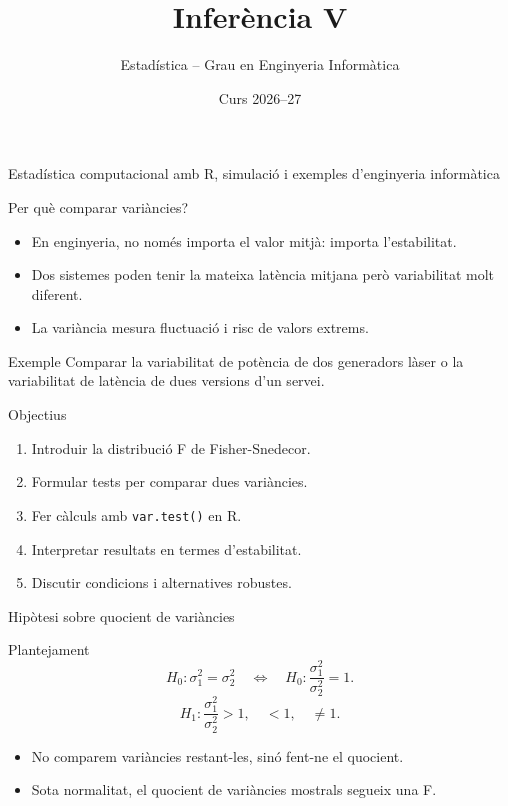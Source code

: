 \documentclass[10pt,aspectratio=169]{beamer}
\title[Inferència V]{Inferència V}
\author{Estadística -- Grau en Enginyeria Informàtica}
\date{Curs 2026--27}
\newcommand{\R}{\textsf{R}}
\begin{document}
\begin{frame}[plain]
  \titlepage
  \vspace{-0.45cm}
  \begin{center}
  \small\textcolor{DeepBlue}{Estadística computacional amb \R, simulació i exemples d'enginyeria informàtica}
  \end{center}
\end{frame}


\begin{frame}[fragile]{Per què comparar variàncies?}
\begin{itemize}
  \item En enginyeria, no només importa el valor mitjà: importa l'estabilitat.
  \item Dos sistemes poden tenir la mateixa latència mitjana però variabilitat molt diferent.
  \item La variància mesura fluctuació i risc de valors extrems.
\end{itemize}
\begin{block}{Exemple}
Comparar la variabilitat de potència de dos generadors làser o la variabilitat de latència de dues versions d'un servei.
\end{block}
\end{frame}

\begin{frame}[fragile]{Objectius}
\begin{enumerate}
  \item Introduir la distribució F de Fisher-Snedecor.
  \item Formular tests per comparar dues variàncies.
  \item Fer càlculs amb \texttt{var.test()} en \R.
  \item Interpretar resultats en termes d'estabilitat.
  \item Discutir condicions i alternatives robustes.
\end{enumerate}
\end{frame}

\begin{frame}[fragile]{Hipòtesi sobre quocient de variàncies}
\begin{block}{Plantejament}
\[
H_0:\sigma_1^2=\sigma_2^2
\quad \Longleftrightarrow \quad
H_0:\frac{\sigma_1^2}{\sigma_2^2}=1.
\]
\[
H_1:\frac{\sigma_1^2}{\sigma_2^2}>1,
\quad <1,
\quad \ne 1.
\]
\end{block}
\begin{itemize}
  \item No comparem variàncies restant-les, sinó fent-ne el quocient.
  \item Sota normalitat, el quocient de variàncies mostrals segueix una F.
\end{itemize}
\end{frame}
\end{document}
